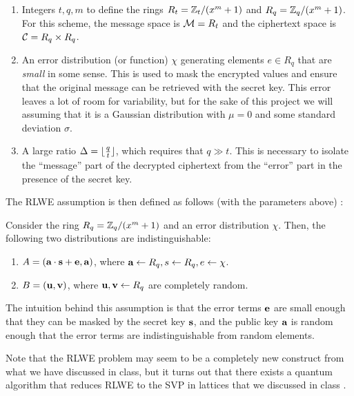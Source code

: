 \documentclass{theme}
\begin{document}
\begin{enumerate}
    \item Integers $t, q, m$ to define the rings $R_t = \mathbb{Z}_t/(x^m + 1)$ and $R_q = \mathbb{Z}_q/(x^m + 1)$. For this scheme, the message space is $\mathcal{M} = R_t$ and the ciphertext space is $\mathcal{C} = R_q \times R_q$.
    \item An error distribution (or function) $\chi$ generating elements $e \in R_q$ that are \textit{small} in some sense. This is used to mask the encrypted values and ensure that the original message can be retrieved with the secret key. This error leaves a lot of room for variability, but for the sake of this project we will assuming that it is a Gaussian distribution with $\mu = 0$ and some standard deviation $\sigma$.
    \item A large ratio $\Delta = \lfloor\frac{q}{t}\rfloor$, which requires that $q \gg t$. This is necessary to isolate the ``message'' part of the decrypted ciphertext from the ``error'' part in the presence of the secret key.
\end{enumerate}

The RLWE assumption is then defined as follows (with the parameters above) \cite{fhe}:

\begin{ndefinition}
    Consider the ring $R_q = \mathbb{Z}_q/(x^m + 1)$ and an error distribution $\chi$. Then, the following two distributions are indistinguishable:

    \begin{enumerate}
        \item $A = (\textbf{a} \cdot \textbf{s} + \textbf{e}, \textbf{a})$, where $\textbf{a} \leftarrow R_q, s \leftarrow R_q, e \leftarrow \chi$.
        \item $B = (\textbf{u}, \textbf{v})$, where $\textbf{u}, \textbf{v} \leftarrow R_q$ are completely random.
    \end{enumerate}
\end{ndefinition}

The intuition behind this assumption is that the error terms $\textbf{e}$ are small enough that they can be masked by the secret key $\textbf{s}$, and the public key $\textbf{a}$ is random enough that the error terms are indistinguishable from random elements.

Note that the RLWE problem may seem to be a completely new construct from what we have discussed in class, but it turns out that there exists a quantum algorithm that reduces RLWE to the SVP in lattices that we discussed in class \cite{fhe} \cite{ideal-lattices}.
\end{document}
